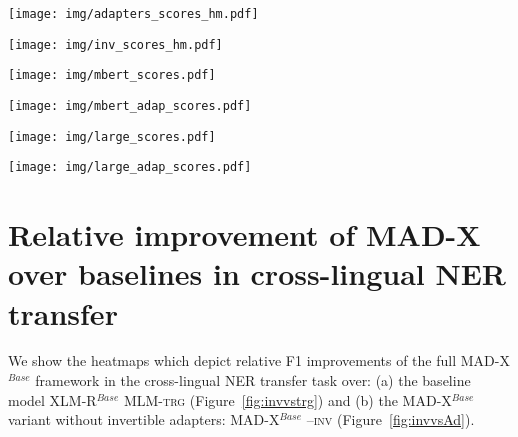 \documentclass[11pt,a4paper]{article}
\newcommand{\model}[1]{\textsc{MAD-X}}
\newcommand{\mlmtrg}[1]{\textsc{XLM-R$^{Base}$ MLM-trg}}
\begin{document}
 \begin{figure*} \centering
\texttt{[image: img/adapters\_scores\_hm.pdf]}
\caption{Mean F1 scores of our framework without invertible adapters (\model{}$^{Base}$ -- \textsc{inv}) for cross-lingual transfer on NER.}
\label{fig:adapters_scores_hm}
\end{figure*}

 \begin{figure*} \centering
\texttt{[image: img/inv\_scores\_hm.pdf]}
\caption{Mean F1 scores of our complete adapter-based framework (\model{}$^{Base}$) for cross-lingual transfer on NER.}
\label{fig:inv_scores_hm}
\end{figure*}

 \begin{figure*} \centering
\texttt{[image: img/mbert\_scores.pdf]}
\caption{Mean F1 scores of mBERT for cross-lingual transfer on NER.}
\label{fig:mbert_scores}
\end{figure*}

 \begin{figure*} \centering
\texttt{[image: img/mbert\_adap\_scores.pdf]}
\caption{Mean F1 scores of our complete adapter-based framework (\model{}$^{mBERT}$) for cross-lingual transfer on NER.}
\label{fig:mbert_adap_scores}
\end{figure*}

 \begin{figure*} \centering
\texttt{[image: img/large\_scores.pdf]}
\caption{Mean F1 scores of XLM-R$^{Large}$ for cross-lingual transfer on NER.}
\label{fig:large_scores}
\end{figure*}

 \begin{figure*} \centering
\texttt{[image: img/large\_adap\_scores.pdf]}
\caption{Mean F1 scores of our complete adapter-based framework (\model{}$^{Large}$) for cross-lingual transfer on NER.}
\label{fig:large_adap_scores}
\end{figure*}

\section{Relative improvement of MAD-X over baselines in cross-lingual NER transfer}
\label{s:relative-appendix}
We show the heatmaps which depict relative F1 improvements of the full \model{}$^{Base}$ framework in the cross-lingual NER transfer task over: (a) the baseline model \mlmtrg{} (Figure~\ref{fig:invvstrg}) and (b) the \model{}$^{Base}$ variant without invertible adapters: \model{}$^{Base}$ --\textsc{inv} (Figure~\ref{fig:invvsAd}).
\end{document}
